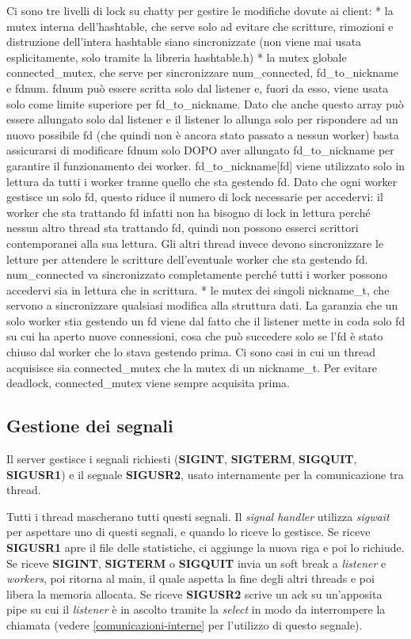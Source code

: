 \documentclass[a4paper]{article}
\theoremstyle{theorem}
\theoremstyle{remark}
\theoremstyle{definition}
\theoremstyle{corollary}
\theoremstyle{lemma}
\newcommand\codeName[1]{%
	\textit{#1}}
\begin{document}
Ci sono tre livelli di lock su chatty per gestire le modifiche dovute ai client:
* la mutex interna dell'hashtable, che serve solo ad evitare che scritture,
rimozioni e distruzione dell'intera hashtable siano sincronizzate (non viene
mai usata esplicitamente, solo tramite la libreria hashtable.h)
* la mutex globale connected\_mutex, che serve per sincronizzare num\_connected,
fd\_to\_nickname e fdnum.
fdnum può essere scritta solo dal listener e, fuori da esso, viene usata solo
come limite superiore per fd\_to\_nickname. Dato che anche questo array può
essere allungato solo dal listener e il listener lo allunga solo per
rispondere ad un nuovo possibile fd (che quindi non è ancora stato passato a
nessun worker) basta assicurarsi di modificare fdnum solo DOPO aver allungato
fd\_to\_nickname per garantire il funzionamento dei worker.
fd\_to\_nickname[fd] viene utilizzato solo in lettura da tutti i worker tranne
quello che sta gestendo fd. Dato che ogni worker gestisce un solo fd, questo
riduce il numero di lock necessarie per accedervi: il worker che sta trattando
fd infatti non ha bisogno di lock in lettura perché nessun altro thread sta
trattando fd, quindi non possono esserci scrittori contemporanei alla sua
lettura. Gli altri thread invece devono sincronizzare le letture per attendere
le scritture dell'eventuale worker che sta gestendo fd.
num\_connected va sincronizzato completamente perché tutti i worker possono
accedervi sia in lettura che in scrittura.
* le mutex dei singoli nickname\_t, che servono a sincronizzare qualsiasi modifica alla struttura dati.
La garanzia che un solo worker stia gestendo un fd viene dal fatto che il listener mette in coda solo fd su cui ha aperto nuove connessioni, cosa che può succedere solo se l'fd è stato chiuso dal worker che lo stava gestendo prima. Ci sono casi in cui un thread acquisisce sia connected\_mutex che la mutex di un nickname\_t. Per evitare deadlock, connected\_mutex viene sempre acquisita prima.

\subsection{Gestione dei segnali}\label{gestione-segnali}
Il server gestisce i segnali richiesti (\textbf{SIGINT}, \textbf{SIGTERM}, \textbf{SIGQUIT}, \textbf{SIGUSR1}) e il segnale \textbf{SIGUSR2}, usato internamente per la comunicazione tra thread.

Tutti i thread mascherano tutti questi segnali. Il \codeName{signal handler} utilizza \codeName{sigwait} per aspettare uno di questi segnali, e quando lo riceve lo gestisce. Se riceve \textbf{SIGUSR1} apre il file delle statistiche, ci aggiunge la nuova riga e poi lo richiude. Se riceve \textbf{SIGINT}, \textbf{SIGTERM} o \textbf{SIGQUIT} invia un soft break a \codeName{listener} e \codeName{workers}, poi ritorna al main, il quale aspetta la fine degli altri threads e poi libera la memoria allocata. Se riceve \textbf{SIGUSR2} scrive un ack su un'apposita pipe su cui il \codeName{listener} è in ascolto tramite la \codeName{select} in modo da interrompere la chiamata (vedere \autoref{comunicazioni-interne} per l'utilizzo di questo segnale).
\end{document}
